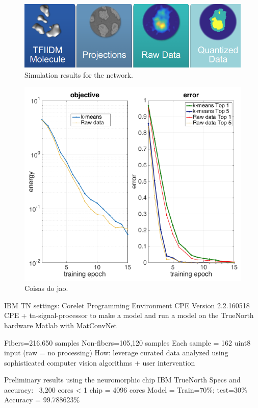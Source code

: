 \documentclass[conference]{IEEEtran}
\begin{document}
\begin{figure}[h]
\centering
\includegraphics[width=\linewidth]{img/joao1.png}
\caption{Simulation results for the network.}
\label{fig_sim}
\end{figure}

\begin{figure}[h]
\centering
\includegraphics[width=\linewidth]{img/joao3.png}
\caption{Coisas do jao.}
\label{fig:cryem}
\end{figure}

IBM TN settings:
Corelet Programming Environment CPE Version 2.2.160518
CPE + tn-signal-processor to make a model
and run a model on the TrueNorth hardware
Matlab with MatConvNet

Fibers=216,650 samples
Non-fibers=105,120 samples
Each sample = 162 uint8 input (raw = no processing)
How: leverage curated data analyzed using sophisticated computer vision algorithms + user intervention

Preliminary results using the neuromorphic chip IBM TrueNorth
Specs and accuracy:
~3,200 cores < 1 chip = 4096 cores
Model = 
Train=70\%; test=30\%
Accuracy = 99.788623\%
\end{document}
